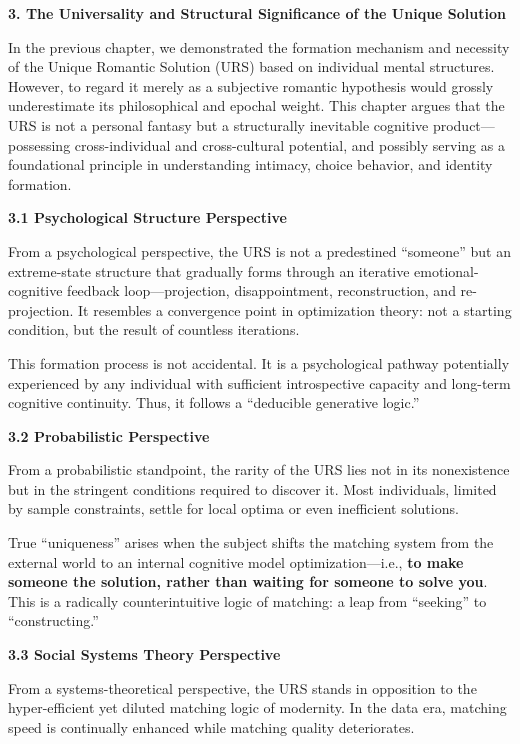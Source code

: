 \documentclass[
]{article}
\begin{document}
\textbf{3. The Universality and Structural Significance of the Unique
Solution}

In the previous chapter, we demonstrated the formation mechanism and
necessity of the Unique Romantic Solution (URS) based on individual
mental structures. However, to regard it merely as a subjective romantic
hypothesis would grossly underestimate its philosophical and epochal
weight. This chapter argues that the URS is not a personal fantasy but a
structurally inevitable cognitive product---possessing cross-individual
and cross-cultural potential, and possibly serving as a foundational
principle in understanding intimacy, choice behavior, and identity
formation.

\textbf{3.1 Psychological Structure Perspective}

From a psychological perspective, the URS is not a predestined
``someone'' but an extreme-state structure that gradually forms through
an iterative emotional-cognitive feedback loop---projection,
disappointment, reconstruction, and re-projection. It resembles a
convergence point in optimization theory: not a starting condition, but
the result of countless iterations.

This formation process is not accidental. It is a psychological pathway
potentially experienced by any individual with sufficient introspective
capacity and long-term cognitive continuity. Thus, it follows a
``deducible generative logic.''

\textbf{3.2 Probabilistic Perspective}

From a probabilistic standpoint, the rarity of the URS lies not in its
nonexistence but in the stringent conditions required to discover it.
Most individuals, limited by sample constraints, settle for local optima
or even inefficient solutions.

True ``uniqueness'' arises when the subject shifts the matching system
from the external world to an internal cognitive model
optimization---i.e., \textbf{to make someone the solution, rather than
waiting for someone to solve you}. This is a radically counterintuitive
logic of matching: a leap from ``seeking'' to ``constructing.''

\textbf{3.3 Social Systems Theory Perspective}

From a systems-theoretical perspective, the URS stands in opposition to
the hyper-efficient yet diluted matching logic of modernity. In the data
era, matching speed is continually enhanced while matching quality
deteriorates.
\end{document}
